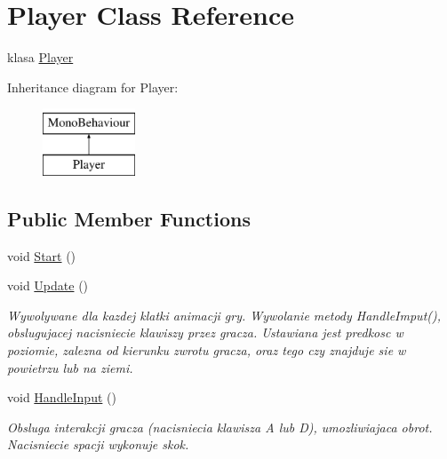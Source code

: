 \hypertarget{class_player}{}\section{Player Class Reference}
\label{class_player}


klasa \hyperlink{class_player}{Player}  


Inheritance diagram for Player\+:\begin{figure}[H]
\begin{center}
\leavevmode
\includegraphics[height=2.000000cm]{class_player}
\end{center}
\end{figure}
\subsection*{Public Member Functions}
\begin{DoxyCompactItemize}
\item 
void \hyperlink{class_player_a1a09a3ded16ac1646f6bdd4f25fe0ddd}{Start} ()
\item 
void \hyperlink{class_player_aace80372e18e32fe177e295fe5d93ba8}{Update} ()
\begin{DoxyCompactList}\small\item\em Wywolywane dla kazdej klatki animacji gry. Wywolanie metody Handle\+Imput(), obslugujacej nacisniecie klawiszy przez gracza. Ustawiana jest predkosc w poziomie, zalezna od kierunku zwrotu gracza, oraz tego czy znajduje sie w powietrzu lub na ziemi. \end{DoxyCompactList}\item 
void \hyperlink{class_player_a6d893d1229110e7eb17eb7d895198717}{Handle\+Input} ()
\begin{DoxyCompactList}\small\item\em Obsluga interakcji gracza (nacisniecia klawisza A lub D), umozliwiajaca obrot. Nacisniecie spacji wykonuje skok. \end{DoxyCompactList}\end{DoxyCompactItemize}
